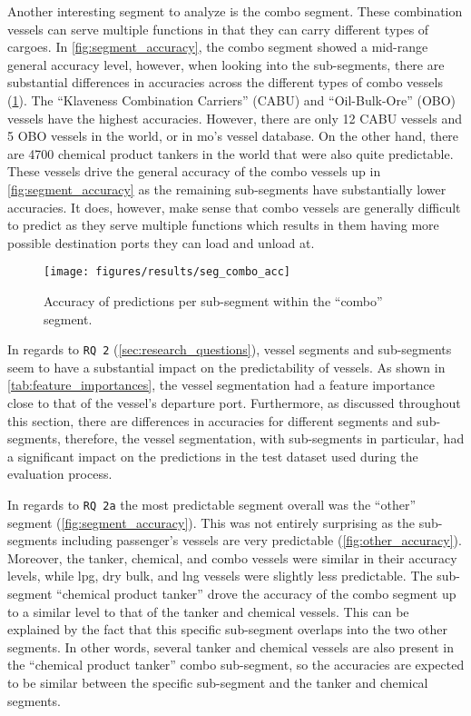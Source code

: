 Another interesting segment to analyze is the combo segment. These combination vessels can serve multiple functions in that they can carry different types of cargoes. In \cref{fig:segment_accuracy}, the combo segment showed a mid-range general accuracy level, however, when looking into the sub-segments, there are substantial differences in accuracies across the different types of combo vessels (\cref{fig:combo_accuracy}). The ``Klaveness Combination Carriers'' (CABU) and ``Oil-Bulk-Ore'' (OBO) vessels have the highest accuracies. However, there are only 12 CABU vessels and 5 OBO vessels in the world, or in \acrfull{mo}'s vessel database. On the other hand, there are 4700 chemical product tankers in the world that were also quite predictable. These vessels drive the general accuracy of the combo vessels up in \cref{fig:segment_accuracy} as the remaining sub-segments have substantially lower accuracies. It does, however, make sense that combo vessels are generally difficult to predict as they serve multiple functions which results in them having more possible destination ports they can load and unload at.

\begin{figure}[htbp]
    \centering
    \texttt{[image: figures/results/seg\_combo\_acc]}
    \caption{Accuracy of predictions per sub-segment within the ``combo'' segment.}
    \label{fig:combo_accuracy}
\end{figure}

In regards to \texttt{RQ 2} (\cref{sec:research_questions}), vessel segments and sub-segments seem to have a substantial impact on the predictability of vessels. As shown in \cref{tab:feature_importances}, the vessel segmentation had a feature importance close to that of the vessel's departure port. Furthermore, as discussed throughout this section, there are differences in accuracies for different segments and sub-segments, therefore, the vessel segmentation, with sub-segments in particular, had a significant impact on the predictions in the test dataset used during the evaluation process.

In regards to \texttt{RQ 2a} the most predictable segment overall was the ``other'' segment (\cref{fig:segment_accuracy}). This was not entirely surprising as the sub-segments including passenger's vessels are very predictable (\cref{fig:other_accuracy}). Moreover, the tanker, chemical, and combo vessels were similar in their accuracy levels, while \acrshort{lpg}, dry bulk, and \acrshort{lng} vessels were slightly less predictable. The sub-segment ``chemical product tanker'' drove the accuracy of the combo segment up to a similar level to that of the tanker and chemical vessels. This can be explained by the fact that this specific sub-segment overlaps into the two other segments. In other words, several tanker and chemical vessels are also present in the ``chemical product tanker'' combo sub-segment, so the accuracies are expected to be similar between the specific sub-segment and the tanker and chemical segments.


